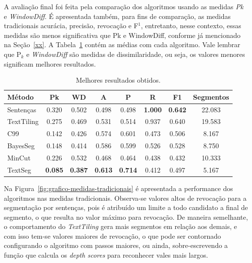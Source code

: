 



A avaliação final foi feita pela comparação dos algoritmos usando as medidas \textit{Pk} e \textit{WindowDiff}. É apresentada também, para fins de comparação, as medidas tradicionais acurácia, precisão, revocação e F$^1$, entretanto, nesse contexto, essas medidas são menos significativa que Pk e WindowDiff, conforme já mencionado na Seção~\ref{xx}. A Tabela~\ref{tab:configfinal} contém as médias com cada algoritmo. Vale lembrar que P$_k$ e \textit{WindowDiff} são medidas de dissimilaridade, ou seja, os valores menores significam melhores resultados.

\begin{table}[!h]
	\centering
\begin{tabular}{|l||c|c|c|c|c|c|c|} 
\hline 
\textbf{M\'{e}todo} & 
\textbf{Pk} & 
\textbf{WD} & 
\textbf{A } & 
\textbf{P } & 
\textbf{R } & 
\textbf{F1} & 
\textbf{Segmentos}\\ \hline

Senten\c{c}as & 0.320 & 0.502 & 0.498 & 0.498 & \textbf{1.000} & \textbf{0.642} & 22.083\\ \hline
TextTiling    & 0.275 & 0.469 & 0.531 & 0.514 & 0.937 & 0.640 & 19.583\\ \hline
C99           & 0.142 & 0.426 & 0.574 & 0.601 & 0.473 & 0.506 & 8.167\\ \hline
BayesSeg      & 0.148 & 0.414 & 0.586 & 0.599 & 0.526 & 0.528 & 8.750\\ \hline
MinCut        & 0.226 & 0.532 & 0.468 & 0.464 & 0.438 & 0.432 & 10.333\\ \hline
TextSeg       & \textbf{0.085} & \textbf{0.387} & \textbf{0.613} & \textbf{0.714} & 0.412 & 0.497 & 5.167\\ \hline
\end{tabular} 

	\caption{Melhores resultados obtidos.}
	\label{tab:configfinal}
\end{table}


Na Figura~\ref{fig:grafico-medidas-tradicionais} é apresentada a performance dos algoritmos nas medidas tradicionais. Observa-se valores altos de revocação para a segmentação por sentenças, pois é atribuído um limite a todo candidato a final de segmento, o que resulta no valor máximo para revocação. De maneira semelhante, o comportamento do \textit{TextTiling} gera 
mais segmentos em relação aos demais, e com isso tem-se valores maiores de revocação, o que pode ser contornado configurando o algoritmo com passos maiores, ou ainda, sobre-escrevendo a função que calcula os \textit{depth scores} para reconhecer vales mais largos.

